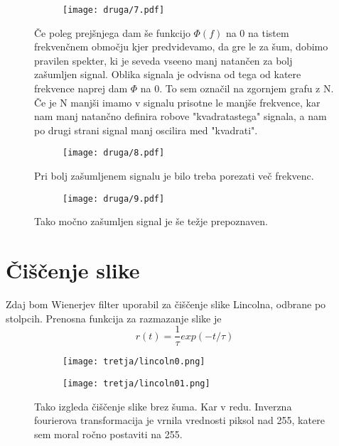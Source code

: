 \documentclass{article}
\begin{document}
\begin{figure}[H]
\centering
\begin{subfigure}{.6\textwidth}
\texttt{[image: druga/7.pdf]}
\end{subfigure}
\caption*{Če poleg prejšnjega dam še funkcijo $\Phi(f)$ na 0 na tistem frekvenčnem območju kjer predvidevamo, da gre le za šum, dobimo pravilen spekter, ki je seveda vseeno manj natančen za bolj zašumljen signal. Oblika signala je odvisna od tega od katere frekvence naprej dam $\Phi$ na 0. To sem označil na zgornjem grafu z N. Če je N manjši imamo v signalu prisotne le manjše frekvence, kar nam manj natančno definira robove "kvadratastega" signala, a nam po drugi strani signal manj oscilira med "kvadrati".}
\end{figure}
\begin{figure}[H]
\centering
\begin{subfigure}{.6\textwidth}
\texttt{[image: druga/8.pdf]}
\end{subfigure}
\caption*{Pri bolj zašumljenem signalu je bilo treba porezati več frekvenc.}
\end{figure}
\begin{figure}[H]
\centering
\begin{subfigure}{.6\textwidth}
\texttt{[image: druga/9.pdf]}
\end{subfigure}
\caption*{Tako močno zašumljen signal je še težje prepoznaven.}
\end{figure}

\newpage
\section{Čiščenje slike}
Zdaj bom Wienerjev filter uporabil za čiščenje slike Lincolna, odbrane po stolpcih.
Prenosna funkcija za razmazanje slike je
\begin{equation*}
r(t) = \frac{1}{\tau} exp(-t/\tau)
\end{equation*}
\begin{figure}[H]
\centering
\begin{subfigure}{.49\textwidth}
\texttt{[image: tretja/lincoln0.png]}
\end{subfigure}
\begin{subfigure}{.49\textwidth}
\texttt{[image: tretja/lincoln01.png]}
\end{subfigure}
\caption*{Tako izgleda čiščenje slike brez šuma. Kar v redu. Inverzna fourierova transformacija je vrnila vrednosti piksol nad 255, katere sem moral ročno postaviti na 255.}
\end{figure}
\end{document}
